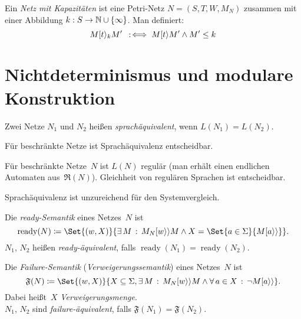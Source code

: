 \documentclass{cheat-sheet}
\newcommand{\activeTransition}[1]{[{#1}\rangle} %
\newcommand{\labelledTransition}[1]{[{#1}\rangle\rangle} %
\newcommand{\ReachabilityGraph}{\mathfrak{R}} %
\DeclareMathOperator{\ready}{ready} %
\newcommand{\Failure}{\mathfrak{F}} %
\begin{document}

\begin{defn}
  Ein \emph{Netz mit Kapazitäten} ist eine Petri-Netz $N = (S, T, W, M_N)$ zusammen mit einer Abbildung $k : S \to \mathbb{N} \cup \{ \infty \}$.
  Man definiert:
  \[
    M \activeTransition{t}_k M' \coloniff M \activeTransition{t} M' \wedge M' \leq k
  \]
\end{defn}

\section{Nichtdeterminismus und modulare Konstruktion}

\begin{defn}
  Zwei Netze $N_1$ und $N_2$ heißen \emph{sprachäquivalent}, wenn $L(N_1) = L(N_2)$.
\end{defn}

\begin{satz}
  Für beschränkte Netze ist Sprachäquivalenz entscheidbar.
\end{satz}

\begin{beweis}
  Für beschränkte Netze~$N$ ist $L(N)$ regulär (man erhält einen endlichen Automaten aus~$\ReachabilityGraph(N)$).
  Gleichheit von regulären Sprachen ist entscheidbar.
\end{beweis}

\begin{bem}
  Sprachäquivalenz ist unzureichend für den Systemvergleich.
\end{bem}

\begin{defn}
  Die \emph{ready-Semantik} eines Netzes~$N$ ist
  \[
    \ready(N) \coloneqq \Set{(w, X)}{\ex{M} M_N \labelledTransition{w} M \wedge X = \Set{a \in \Sigma}{M \labelledTransition{a}}}.
  \]
  $N_1$, $N_2$ heißen \emph{ready-äquivalent}, falls $\ready(N_1) = \ready(N_2)$.
\end{defn}

\begin{defn}
  Die \emph{Failure-Semantik} (\textit{Verweigerungssemantik}) eines Netzes~$N$ ist
  \[
    \Failure(N) \coloneqq \Set{(w, X)}{X \subseteq \Sigma, \ex{M} M_N \labelledTransition{w} M \wedge \fa{a \in X} \neg M \labelledTransition{a}}.
  \]
  Dabei heißt~$X$ \textit{Verweigerungsmenge}. \\
  $N_1$, $N_2$ sind \emph{failure-äquivalent}, falls $\Failure(N_1) = \Failure(N_2)$.
\end{defn}
\end{document}
